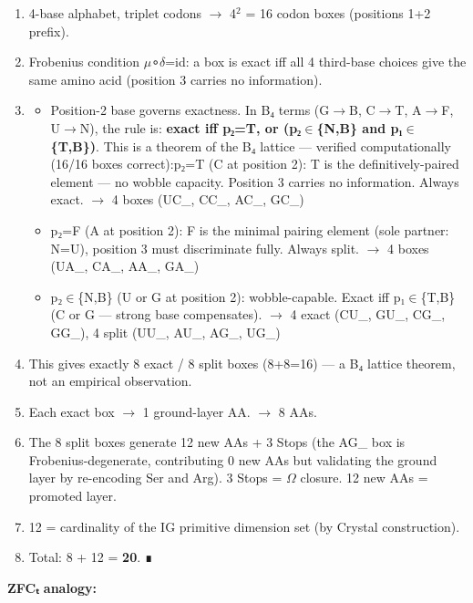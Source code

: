 \documentclass[12pt,a4paper]{article}
\begin{document}
\begin{enumerate}
    \item 4-base alphabet, triplet codons $\rightarrow$ 4$^{2}$ = 16 codon boxes (positions 1+2 prefix).
    \item Frobenius condition $\mu$∘$\delta$=id: a box is exact iff all 4 third-base choices give
the same amino acid (position 3 carries no information).
    \item 
    \begin{itemize}
    \item Position-2 base governs exactness. In B₄ terms (G$\rightarrow$B, C$\rightarrow$T, A$\rightarrow$F, U$\rightarrow$N), the rule
is: \textbf{exact iff p₂=T, or (p₂$\in$\{N,B\} and p₁$\in$\{T,B\})}. This is a theorem of the
B₄ lattice --- verified computationally (16/16 boxes correct):p₂=T (C at position 2): T is the definitively-paired element --- no wobble capacity.
Position 3 carries no information. Always exact. $\rightarrow$ 4 boxes (UC\_, CC\_, AC\_, GC\_)
    \item p₂=F (A at position 2): F is the minimal pairing element (sole partner: N=U),
position 3 must discriminate fully. Always split. $\rightarrow$ 4 boxes (UA\_, CA\_, AA\_, GA\_)
    \item p₂$\in$\{N,B\} (U or G at position 2): wobble-capable. Exact iff p₁$\in$\{T,B\} (C or G ---
strong base compensates). $\rightarrow$ 4 exact (CU\_, GU\_, CG\_, GG\_), 4 split (UU\_, AU\_, AG\_, UG\_)
\end{itemize}

    \item This gives exactly 8 exact / 8 split boxes (8+8=16) --- a B₄ lattice theorem, not
an empirical observation.
    \item Each exact box $\rightarrow$ 1 ground-layer AA. $\rightarrow$ 8 AAs.
    \item The 8 split boxes generate 12 new AAs + 3 Stops (the AG\_ box is
Frobenius-degenerate, contributing 0 new AAs but validating the ground layer
by re-encoding Ser and Arg). 3 Stops = $\Omega$ closure. 12 new AAs = promoted layer.
    \item 12 = cardinality of the IG primitive dimension set (by Crystal construction).
    \item Total: 8 + 12 = \textbf{20}. ∎
\end{enumerate}

\textbf{ZFCₜ analogy:}
\end{document}

